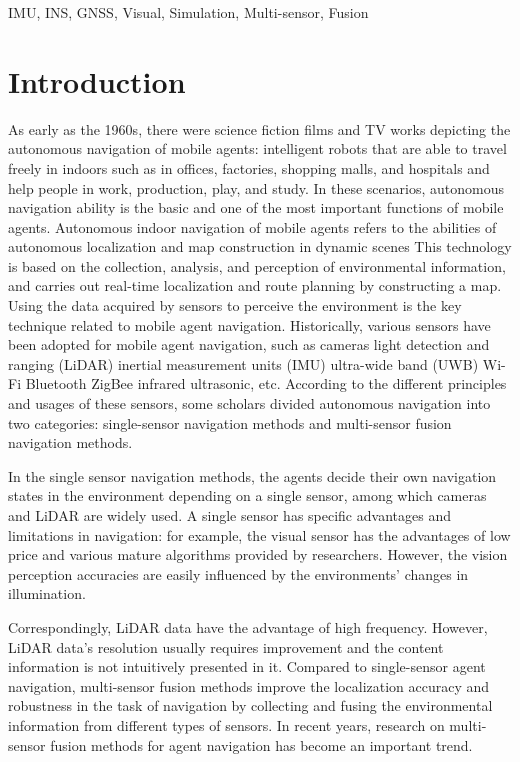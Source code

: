 \documentclass[conference]{IEEEtran}
\begin{document}
\begin{IEEEkeywords}
IMU, INS, GNSS, Visual, Simulation, Multi-sensor, Fusion
\end{IEEEkeywords}

\section{Introduction}
As early as the 1960s, there were science fiction films and TV works depicting the autonomous navigation of mobile agents: intelligent robots that are able to travel freely in indoors such as in offices, factories, shopping malls, and hospitals and help people in work, production, play, and study. In these scenarios, autonomous navigation ability is the basic and one of the most important functions of mobile agents.
Autonomous indoor navigation of mobile agents refers to the abilities of autonomous localization and map construction in dynamic scenes This technology is based on the collection, analysis, and perception of environmental information, and carries out real-time localization and route planning by constructing a map. Using the data acquired by sensors to perceive the environment is the key technique related to mobile agent navigation. Historically, various sensors have been adopted for mobile agent navigation, such as cameras light detection and ranging (LiDAR) inertial measurement units (IMU) ultra-wide band (UWB) Wi-Fi Bluetooth ZigBee infrared ultrasonic, etc. According to the different principles and usages of these sensors, some scholars divided autonomous navigation into two categories: single-sensor navigation methods and multi-sensor fusion navigation methods.


In the single sensor navigation methods, the agents decide their own navigation states in the environment depending on a single sensor, among which cameras and LiDAR are widely used. A single sensor has specific advantages and limitations in navigation: for example, the visual sensor has the advantages of low price and various mature algorithms provided by researchers. However, the vision perception accuracies are easily influenced by the environments’ changes in illumination. 

Correspondingly, LiDAR data have the advantage of high frequency. However, LiDAR data’s resolution usually requires improvement and the content information is not intuitively presented in it. Compared to single-sensor agent navigation, multi-sensor fusion methods improve the localization accuracy and robustness in the task of navigation by collecting and fusing the environmental information from different types of sensors. In recent years, research on multi-sensor fusion methods for agent navigation has become an important trend.
\end{document}
